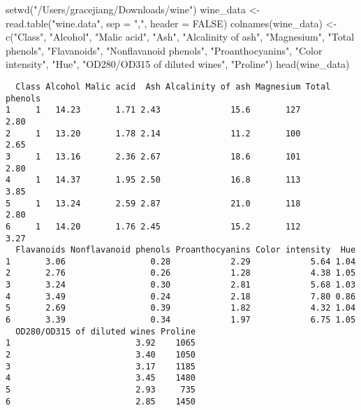 \documentclass[
  letterpaper,
  DIV=11,
  numbers=noendperiod]{scrartcl}
\newenvironment{Shaded}{\begin{snugshade}}{\end{snugshade}}
\newcommand{\AttributeTok}[1]{\textcolor[rgb]{0.40,0.45,0.13}{#1}}
\newcommand{\ConstantTok}[1]{\textcolor[rgb]{0.56,0.35,0.01}{#1}}
\newcommand{\FunctionTok}[1]{\textcolor[rgb]{0.28,0.35,0.67}{#1}}
\newcommand{\NormalTok}[1]{\textcolor[rgb]{0.00,0.23,0.31}{#1}}
\newcommand{\OtherTok}[1]{\textcolor[rgb]{0.00,0.23,0.31}{#1}}
\newcommand{\StringTok}[1]{\textcolor[rgb]{0.13,0.47,0.30}{#1}}
\begin{document}
\begin{Shaded}
\begin{Highlighting}[]
\FunctionTok{setwd}\NormalTok{(}\StringTok{"/Users/gracejiang/Downloads/wine"}\NormalTok{)}
\NormalTok{wine\_data }\OtherTok{\textless{}{-}} \FunctionTok{read.table}\NormalTok{(}\StringTok{"wine.data"}\NormalTok{, }\AttributeTok{sep =} \StringTok{","}\NormalTok{, }\AttributeTok{header =} \ConstantTok{FALSE}\NormalTok{)}
\FunctionTok{colnames}\NormalTok{(wine\_data) }\OtherTok{\textless{}{-}} \FunctionTok{c}\NormalTok{(}\StringTok{"Class"}\NormalTok{, }\StringTok{"Alcohol"}\NormalTok{, }\StringTok{"Malic acid"}\NormalTok{, }\StringTok{"Ash"}\NormalTok{, }\StringTok{"Alcalinity of ash"}\NormalTok{, }\StringTok{"Magnesium"}\NormalTok{, }\StringTok{"Total phenols"}\NormalTok{, }\StringTok{"Flavanoids"}\NormalTok{, }\StringTok{"Nonflavanoid phenols"}\NormalTok{, }\StringTok{"Proanthocyanins"}\NormalTok{, }\StringTok{"Color intensity"}\NormalTok{, }\StringTok{"Hue"}\NormalTok{, }\StringTok{"OD280/OD315 of diluted wines"}\NormalTok{, }\StringTok{"Proline"}\NormalTok{)}
\FunctionTok{head}\NormalTok{(wine\_data)}
\end{Highlighting}
\end{Shaded}

\begin{verbatim}
  Class Alcohol Malic acid  Ash Alcalinity of ash Magnesium Total phenols
1     1   14.23       1.71 2.43              15.6       127          2.80
2     1   13.20       1.78 2.14              11.2       100          2.65
3     1   13.16       2.36 2.67              18.6       101          2.80
4     1   14.37       1.95 2.50              16.8       113          3.85
5     1   13.24       2.59 2.87              21.0       118          2.80
6     1   14.20       1.76 2.45              15.2       112          3.27
  Flavanoids Nonflavanoid phenols Proanthocyanins Color intensity  Hue
1       3.06                 0.28            2.29            5.64 1.04
2       2.76                 0.26            1.28            4.38 1.05
3       3.24                 0.30            2.81            5.68 1.03
4       3.49                 0.24            2.18            7.80 0.86
5       2.69                 0.39            1.82            4.32 1.04
6       3.39                 0.34            1.97            6.75 1.05
  OD280/OD315 of diluted wines Proline
1                         3.92    1065
2                         3.40    1050
3                         3.17    1185
4                         3.45    1480
5                         2.93     735
6                         2.85    1450
\end{verbatim}
\end{document}
